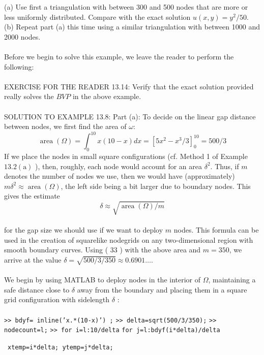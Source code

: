\documentclass[../main.tex]{subfiles}
\begin{document}
(a) Use first a triangulation with between 300 and 500 nodes that are more or less uniformly distributed. Compare with the exact solution $u(x, y)=y^{2} / 50$.\\
(b) Repeat part (a) this time using a similar triangulation with between 1000 and 2000 nodes.
\\
\\
Before we begin to solve this example, we leave the reader to perform the following:
\\
\\
EXERCISE FOR THE READER 13.14: Verify that the exact solution provided really solves the $B V P$ in the above example.
\\
\\
SOLUTION TO EXAMPLE 13.8: Part (a): To decide on the linear gap distance 
between nodes, we first find the area of $\omega$: 
$$
\operatorname{area}(\Omega)=\int_{0}^{10} x(10-x) d x=\left[5 x^{2}-x^{3} / 3\right]_{0}^{10}=500 / 3
$$
If we place the nodes in small square configurations (cf. Method 1 of Example $13.2(\mathrm{a})$ ), then, roughly, each node would account for an area $\delta^{2}$. Thus, if $m$ denotes the number of nodes we use, then we would have (approximately) $m \delta^{2} \approx \operatorname{area}(\Omega)$, the left side being a bit larger due to boundary nodes. This gives the estimate
\\
\begin{equation}
\delta \approx \sqrt{\operatorname{area}(\Omega) / m}
\end{equation}
\\
for the gap size we should use if we want to deploy $m$ nodes. This formula can be used in the creation of squarelike nodegrids on any two-dimensional region with smooth boundary curves. Using ( 33 ) with the above area and $m=350$, we arrive at the value $\delta=\sqrt{500 / 3 / 350 }\approx 0.6901 \ldots .$
\\
\\
We begin by using MATLAB to deploy nodes in the interior of $\Omega$, maintaining a safe distance close to $\delta$ away from the boundary and placing them in a square grid configuration with sidelength $\delta$ :
\\
\\
\texttt{>> bdyf= inline('x.*(10-x)') ;}
\texttt{>> delta=sqrt(500/3/350);}
\texttt{>> nodecount=l;}
\texttt{>> for i=l:10/delta}
\texttt{for j=l:bdyf(i*delta)/delta}

~\texttt{xtemp=i*delta; ytemp=j*delta;}
\end{document}

